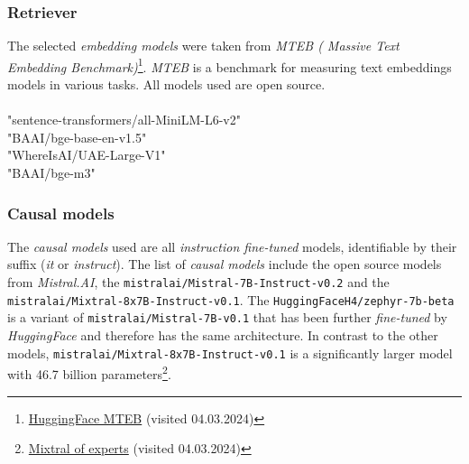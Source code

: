 \documentclass{article}
\begin{document}
\subsubsection*{Retriever}
The selected \textit{embedding models} were taken from \textit{MTEB ( Massive Text Embedding Benchmark)}\footnote{\href{https://huggingface.co/spaces/mteb/leaderboard}{HuggingFace MTEB} (visited 04.03.2024)}. \textit{MTEB} \cite{MTEB} is a benchmark for measuring text embeddings models in various tasks. All models used are open source.\\
\\
"sentence-transformers/all-MiniLM-L6-v2"\\ 
"BAAI/bge-base-en-v1.5"\\ 
"WhereIsAI/UAE-Large-V1"\\ 
"BAAI/bge-m3"

\subsubsection*{Causal models}
The \textit{causal models} used are all \textit{instruction fine-tuned} models, identifiable by their suffix (\textit{it} or \textit{instruct}).
The list of \textit{causal models} include the open source models from \textit{Mistral.AI}, the \colorbox{lightgray!25}{\lstinline{mistralai/Mistral-7B-Instruct-v0.2}} and the \colorbox{lightgray!25}{\lstinline{mistralai/Mixtral-8x7B-Instruct-v0.1}}. The \colorbox{lightgray!25}{\lstinline{HuggingFaceH4/zephyr-7b-beta}} is a variant of \colorbox{lightgray!25}{\lstinline{mistralai/Mistral-7B-v0.1}} that has been further \textit{fine-tuned} by \textit{HuggingFace} and therefore has the same architecture. In contrast to the other models, \colorbox{lightgray!25}{\lstinline{mistralai/Mixtral-8x7B-Instruct-v0.1}} is a significantly larger model with 46.7 billion parameters\footnote{\href{https://mistral.ai/news/mixtral-of-experts/}{Mixtral of experts} (visited 04.03.2024)}.
\end{document}
